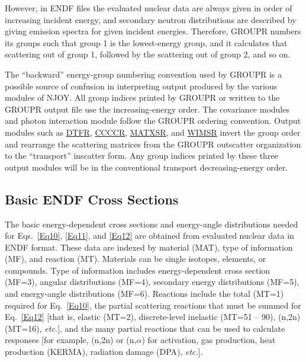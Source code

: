 However, in ENDF files the evaluated nuclear data are always given in
order of increasing incident energy, and secondary neutron distributions
are described by giving emission spectra for given incident energies.
Therefore, GROUPR numbers its groups such that group 1 is the
lowest-energy group, and it calculates that scattering out of group 1,
followed by the scattering out of group 2, and so on.

The ``backward'' energy-group numbering convention used by GROUPR is a
possible source of confusion in interpreting output produced by the
various modules of NJOY.  All group indices printed by GROUPR or written
to the GROUPR output file use the increasing-energy order.  The
covariance modules and photon interaction module follow the GROUPR
ordering convention.  Output modules such as
\hyperlink{sDTFRhy}{DTFR}, \hyperlink{sCCCCRhy}{CCCCR},
\hyperlink{sMATXSRhy}{MATXSR}, and \hyperlink{sWIMSRhy}{WIMSR}
invert the group order and rearrange the scattering matrices from
the GROUPR outscatter organization to the ``transport'' inscatter form.
Any group indices printed by these three output modules will be in the
conventional transport decreasing-energy order.

\subsection{Basic ENDF Cross Sections}
\label{ssGROUPR_BasicXS}

The basic energy-dependent cross sections and energy-angle distributions
needed for Eqs.~\ref{Eq10}, \ref{Eq11}, and \ref{Eq12} are obtained
from evaluated nuclear data in ENDF format\cite{ENDF102}.  These data
are indexed by material (MAT), type of information (MF), and reaction (MT).
Materials can be single isotopes, elements, or compounds.  Type of
information includes energy-dependent cross section (MF=3), angular
distributions (MF=4), secondary energy distributions (MF=5), and
energy-angle distributions (MF=6).  Reactions include the total (MT=1)
required for Eq.~\ref{Eq10}, the partial scattering reactions that must
be summed for Eq.~\ref{Eq12} [that is, elastic (MT=2), discrete-level
inelastic (MT=51 -- 90), (n,2n) (MT=16), {\it etc.}], and the many partial
reactions that can be used to calculate responses [for example, (n,2n)
or (n,$\alpha$) for activation, gas production, heat production (KERMA),
radiation damage (DPA), {\it etc.}].

